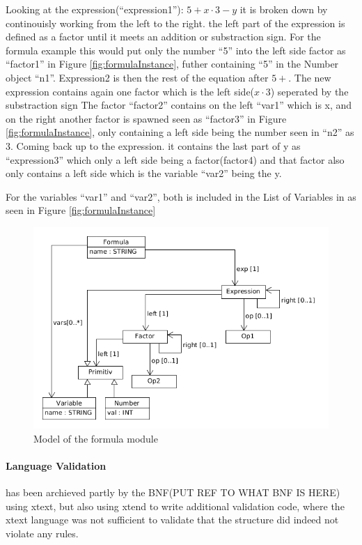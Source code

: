 Looking at the expression(``expression1''): $5 + x \cdot 3 - y$ it is broken down by continouisly
working from the left to the right. the left part of the expression is defined as a factor until
it meets an addition or substraction sign. For the formula example this would put only the number
``5'' into the left side factor as ``factor1'' in Figure \ref{fig:formulaInstance},
futher containing ``5'' in the Number object ``n1''.
Expression2 is then the rest of the equation after $5 +$. The new expression
contains again one factor which is the left side($x \cdot 3$) seperated by the substraction sign
The factor ``factor2'' contains on the left ``var1'' which is x, and on the right another factor
is spawned seen as ``factor3'' in Figure \ref{fig:formulaInstance}, only containing a left
side being the number seen in ``n2'' as 3.
Coming back up to the expression. it contains the last part of y as ``expression3''
which only a left side being a factor(factor4) and that factor also only contains a left side
which is the variable ``var2'' being the y.

For the variables ``var1'' and ``var2'', both is included in the List of Variables in as seen in
Figure \ref{fig:formulaInstance}


\begin{figure}
  \begin{center}
  \includegraphics[width=\linewidth]{images/MetaFormula}
  \end{center}
  \caption{Model of the formula module}
  \label{fig:formulaModel}
\end{figure}
\paragraph{Language Validation}
has been archieved partly by the BNF(PUT REF TO WHAT BNF IS HERE) using xtext, but also
using xtend to write additional validation code, where the xtext language was not sufficient
to validate that the structure did indeed not violate any rules.

